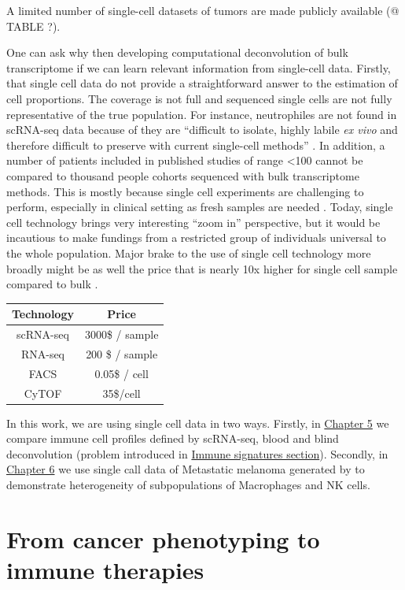 \documentclass[12pt,]{book}
\theoremstyle{definition}
\theoremstyle{definition}
\theoremstyle{definition}
\theoremstyle{remark}
\begin{document}
A limited number of single-cell datasets of tumors are made publicly
available (@ TABLE ?).

One can ask why then developing computational deconvolution of bulk
transcriptome if we can learn relevant information from single-cell
data. Firstly, that single cell data do not provide a straightforward
answer to the estimation of cell proportions. The coverage is not full
and sequenced single cells are not fully representative of the true
population. For instance, neutrophiles are not found in scRNA-seq data
because of they are ``difficult to isolate, highly labile \emph{ex vivo}
and therefore difficult to preserve with current single-cell methods''
\citep{Schelker2017}. In addition, a number of patients included in
published studies of range \textless{}100 cannot be compared to thousand
people cohorts sequenced with bulk transcriptome methods. This is mostly
because single cell experiments are challenging to perform, especially
in clinical setting as fresh samples are needed \citep{Schelker2017}.
Today, single cell technology brings very interesting ``zoom in''
perspective, but it would be incautious to make fundings from a
restricted group of individuals universal to the whole population. Major
brake to the use of single cell technology more broadly might be as well
the price that is nearly 10x higher for single cell sample compared to
bulk \citep{Cedar2018}.

\begin{longtable}[]{@{}cc@{}}
\toprule
Technology & Price\tabularnewline
\midrule
\endhead
scRNA-seq & 3000\$ / sample\tabularnewline
RNA-seq & 200 \$ / sample\tabularnewline
FACS & 0.05\$ / cell\tabularnewline
CyTOF & 35\$/cell\tabularnewline
\bottomrule
\end{longtable}

In this work, we are using single cell data in two ways. Firstly, in
\protect\hyperlink{results}{Chapter 5} we compare immune cell profiles
defined by scRNA-seq, blood and blind deconvolution (problem introduced
in \protect\hyperlink{immune-signatures}{Immune signatures section}).
Secondly, in \protect\hyperlink{map}{Chapter 6} we use single call data
of Metastatic melanoma generated by \citet{Tirosh2016} to demonstrate
heterogeneity of subpopulations of Macrophages and NK cells.

\hypertarget{immunotherapies}{%
\section{From cancer phenotyping to immune
therapies}\label{immunotherapies}}
\end{document}
